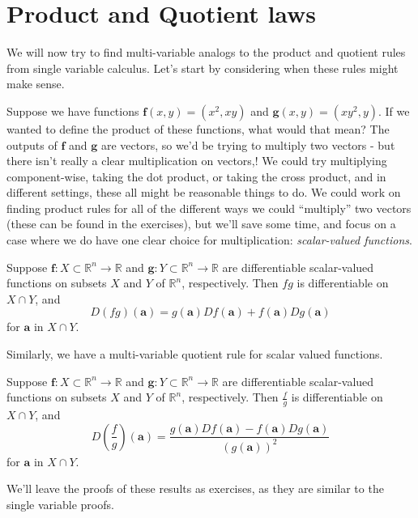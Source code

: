 \documentclass{ximera}
\begin{document}
\section{Product and Quotient laws}

We will now try to find multi-variable analogs to the product and quotient rules from single variable calculus. Let's start by considering when these rules might make sense.

Suppose we have functions $\mathbf{f}(x,y) = (x^2,xy)$ and $\mathbf{g}(x,y) = (xy^2, y)$. If we wanted to define the product of these functions, what would that mean? The outputs of $\mathbf{f}$ and $\mathbf{g}$ are vectors, so we'd be trying to multiply two vectors - but there isn't really a clear multiplication on vectors,! We could try multiplying component-wise, taking the dot product, or taking the cross product, and in different settings, these all might be reasonable things to do. We could work on finding product rules for all of the different ways we could ``multiply'' two vectors (these can be found in the exercises), but we'll save some time, and focus on a case where we do have one clear choice for multiplication: \emph{scalar-valued functions}.

\begin{proposition}
Suppose $\mathbf{f}:X\subset \mathbb{R}^n\rightarrow \mathbb{R}$ and $\mathbf{g}:Y\subset\mathbb{R}^n\rightarrow\mathbb{R}$ are differentiable scalar-valued functions on subsets $X$ and $Y$ of $\mathbb{R}^n$, respectively. Then $fg$ is differentiable on $X\cap Y$, and \[D(fg)(\mathbf{a})=g(\mathbf{a})Df(\mathbf{a})+f(\mathbf{a})Dg(\mathbf{a})\] for $\mathbf{a}$ in $X\cap Y$.
\end{proposition}

Similarly, we have a multi-variable quotient rule for scalar valued functions.

\begin{proposition}
Suppose $\mathbf{f}:X\subset \mathbb{R}^n\rightarrow \mathbb{R}$ and $\mathbf{g}:Y\subset\mathbb{R}^n\rightarrow\mathbb{R}$ are differentiable scalar-valued functions on subsets $X$ and $Y$ of $\mathbb{R}^n$, respectively. Then $\frac{f}{g}$ is differentiable on $X\cap Y$, and \[D\left(\frac{f}{g}\right)(\mathbf{a})=\frac{g(\mathbf{a})Df(\mathbf{a})-f(\mathbf{a})Dg(\mathbf{a})}{(g(\mathbf{a}))^2}\] for $\mathbf{a}$ in $X\cap Y$.
\end{proposition}

We'll leave the proofs of these results as exercises, as they are similar to the single variable proofs.
\end{document}
